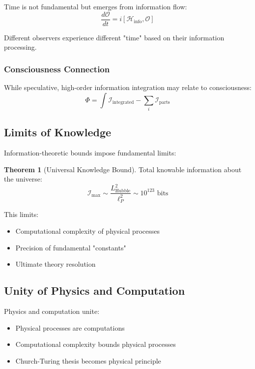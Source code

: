 \documentclass[11pt,a4paper]{article}
\theoremstyle{definition}
\newtheorem{theorem}{Theorem}[section]
\begin{document}
Time is not fundamental but emerges from information flow:
\begin{equation}
\frac{d\mathcal{O}}{dt} = i[\mathcal{H}_{\text{info}}, \mathcal{O}]
\end{equation}

Different observers experience different "time" based on their information processing.

\subsubsection{Consciousness Connection}

While speculative, high-order information integration may relate to consciousness:
\begin{equation}
\Phi = \int \mathcal{I}_{\text{integrated}} - \sum_i \mathcal{I}_{\text{parts}}
\end{equation}

\subsection{Limits of Knowledge}

Information-theoretic bounds impose fundamental limits:

\begin{theorem}[Universal Knowledge Bound]
Total knowable information about the universe:
\begin{equation}
\mathcal{I}_{\text{max}} \sim \frac{L_{\text{Hubble}}^2}{\ell_P^2} \sim 10^{123} \text{ bits}
\end{equation}
\end{theorem}

This limits:
\begin{itemize}
\item Computational complexity of physical processes
\item Precision of fundamental "constants"
\item Ultimate theory resolution
\end{itemize}

\subsection{Unity of Physics and Computation}

Physics and computation unite:
\begin{itemize}
\item Physical processes are computations
\item Computational complexity bounds physical processes
\item Church-Turing thesis becomes physical principle
\end{itemize}
\end{document}
